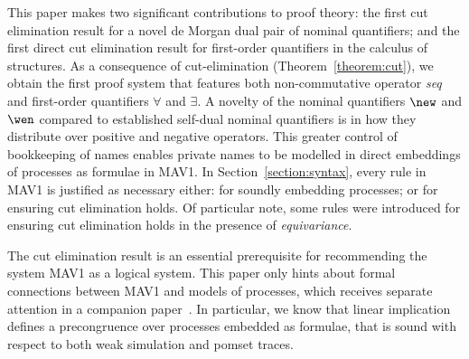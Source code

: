\documentclass[UKenglish,acmsmall,authorversion]{acmart}
\theoremstyle{plain}
\begin{document}
This paper makes two significant contributions to proof theory: the first cut elimination result for a novel de Morgan dual pair of nominal quantifiers;
and the first direct cut elimination result for first-order quantifiers in the calculus of structures. 
As a consequence of cut-elimination (Theorem~\ref{theorem:cut}), we obtain the first proof system that features both
non-commutative operator \textit{seq} and first-order quantifiers $\forall$ and $\exists$.
%
A novelty of the nominal quantifiers $\new$ and $\wen$
 compared to established self-dual nominal quantifiers
is in how they distribute over positive and negative operators. 
This greater control of bookkeeping of names enables private names to be modelled in direct embeddings of 
processes as formulae in \textsf{MAV1}.
In Section~\ref{section:syntax}, every rule in \textsf{MAV1} is justified as necessary either: for soundly embedding processes;
or for ensuring cut elimination holds. Of particular note, some rules were introduced for ensuring cut elimination holds in the presence of \textit{equivariance}.

The cut elimination result is an essential prerequisite for recommending the system \textsf{MAV1} as a logical system.
This paper only hints about formal connections between \textsf{MAV1} and models of processes, which receives separate attention in a companion paper~\cite{MSCS}.
In particular, we know that linear implication defines a precongruence over processes embedded as formulae, that is sound with respect to both weak simulation and pomset traces.
\end{document}
